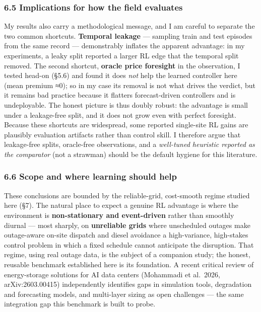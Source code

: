 \documentclass[
  11pt,
]{article}
\begin{document}
\subsubsection{6.5 Implications for how the field
evaluates}\label{implications-for-how-the-field-evaluates}

My results also carry a methodological message, and I am careful to
separate the two common shortcuts. \textbf{Temporal leakage} ---
sampling train and test episodes from the same record --- demonstrably
inflates the apparent advantage: in my experiments, a leaky split
reported a larger RL edge that the temporal split removed. The second
shortcut, \textbf{oracle price foresight} in the observation, I tested
head-on (§5.6) and found it does \emph{not} help the learned controller
here (mean premium ≈0); so in my case its removal is not what drives the
verdict, but it remains bad practice because it flatters forecast-driven
controllers and is undeployable. The honest picture is thus doubly
robust: the advantage is small under a leakage-free split, and it does
not grow even with perfect foresight. Because these shortcuts are
widespread, some reported single-site RL gains are plausibly evaluation
artifacts rather than control skill. I therefore argue that leakage-free
splits, oracle-free observations, and a \emph{well-tuned heuristic
reported as the comparator} (not a strawman) should be the default
hygiene for this literature.

\subsubsection{6.6 Scope and where learning should
help}\label{scope-and-where-learning-should-help}

These conclusions are bounded by the reliable-grid, cost-smooth regime
studied here (§7). The natural place to expect a genuine RL advantage is
where the environment is \textbf{non-stationary and event-driven} rather
than smoothly diurnal --- most sharply, on \textbf{unreliable grids}
where unscheduled outages make outage-aware on-site dispatch and diesel
avoidance a high-variance, high-stakes control problem in which a fixed
schedule cannot anticipate the disruption. That regime, using real
outage data, is the subject of a companion study; the honest, reusable
benchmark established here is its foundation. A recent critical review
of energy-storage solutions for AI data centers (Mohammadi et al.~2026,
arXiv:2603.00415) independently identifies gaps in simulation tools,
degradation and forecasting models, and multi-layer sizing as open
challenges --- the same integration gap this benchmark is built to
probe.
\end{document}
